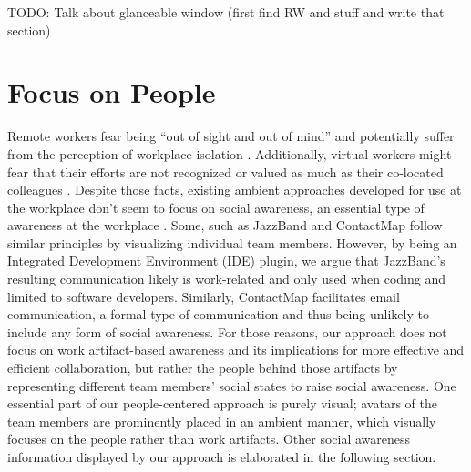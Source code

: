 TODO: Talk about glanceable window (first find RW and stuff and write that section)

\section{Focus on People}
Remote workers fear being \enquote{out of sight and out of mind} \autocite{bailey1999advantages} and potentially suffer from the perception of workplace isolation \autocite{mulki2009set, marshall2007workplace}. Additionally, virtual workers might fear that their efforts are not recognized or valued as much as their co-located colleagues \autocite{cooper2002telecommuting}. Despite those facts, existing ambient approaches developed for use at the workplace don't seem to focus on social awareness, an essential type of awareness at the workplace \autocite{greenberg1996awareness}. Some, such as JazzBand and ContactMap \autocite{cheng2003jazzing, whittaker2004contactmap} follow similar principles by visualizing individual team members. However, by being an Integrated Development Environment (IDE) plugin, we argue that JazzBand's resulting communication likely is work-related and only used when coding and limited to software developers. Similarly, ContactMap facilitates email communication, a formal type of communication and thus being unlikely to include any form of social awareness. For those reasons, our approach does not focus on work artifact-based awareness and its implications for more effective and efficient collaboration, but rather the people behind those artifacts by representing different team members' social states to raise social awareness. One essential part of our people-centered approach is purely visual; avatars of the team members are prominently placed in an ambient manner, which visually focuses on the people rather than work artifacts. Other social awareness information displayed by our approach is elaborated in the following section.

